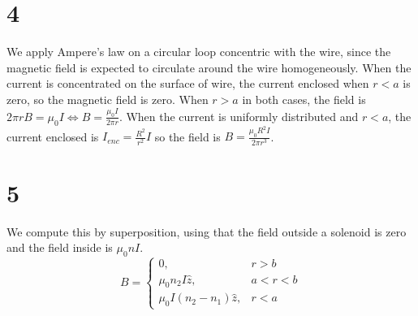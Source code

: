 \documentclass{article}\usepackage{amsmath}
\begin{document}
\section*{4}
We apply Ampere's law on a circular loop concentric with the wire, since the magnetic field is expected to circulate around the wire homogeneously. When the current is concentrated on the surface of wire, the current enclosed when $r < a$ is zero, so the magnetic field is zero. When $r > a$ in both cases, the field is $2\pi rB=\mu_0I\Leftrightarrow B = \frac{\mu_0 I}{2\pi r}$.
When the current is uniformly distributed and $r < a$, the current enclosed is $I_{enc}=\frac{R^2}{r^2}I$ so the field is $B=\frac{\mu_0R^2I}{2\pi r^3}$.

\section*{5}
We compute this by superposition, using that the field outside a solenoid is zero and the field inside is $\mu_0n I$.
\[B=\begin{cases}
    0, & r > b \\
    \mu_0n_2I\hat{z}, & a < r < b \\
    \mu_0I(n_2-n_1)\hat{z}, & r < a
  \end{cases}\]
\end{document}
